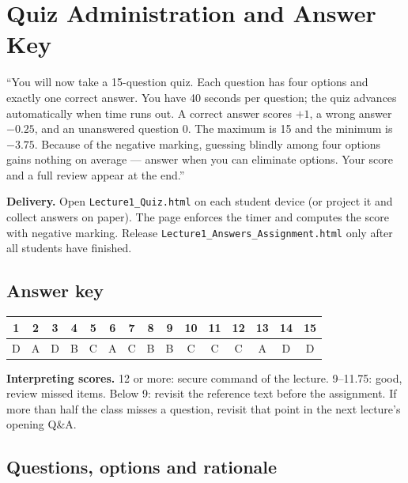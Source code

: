 \documentclass[11pt]{article}
\begin{document}
\section{Quiz Administration and Answer Key}

\begin{sayit}``You will now take a 15-question quiz. Each question has four options and exactly one correct answer. You have 40 seconds per question; the quiz advances automatically when time runs out. A correct answer scores $+1$, a wrong answer $-0.25$, and an unanswered question 0. The maximum is 15 and the minimum is $-3.75$. Because of the negative marking, guessing blindly among four options gains nothing on average --- answer when you can eliminate options. Your score and a full review appear at the end.''\end{sayit}

\textbf{Delivery.} Open \texttt{Lecture1\_Quiz.html} on each student device (or project it and collect answers on paper). The page enforces the timer and computes the score with negative marking. Release \texttt{Lecture1\_Answers\_Assignment.html} only after all students have finished.

\subsection*{Answer key}\begin{center}\small\renewcommand{\arraystretch}{1.3}\begin{tabular}{|c|c|c|c|c|c|c|c|c|c|c|c|c|c|c|}\hline \textbf{1} & \textbf{2} & \textbf{3} & \textbf{4} & \textbf{5} & \textbf{6} & \textbf{7} & \textbf{8} & \textbf{9} & \textbf{10} & \textbf{11} & \textbf{12} & \textbf{13} & \textbf{14} & \textbf{15}\\\hline D & A & D & B & C & A & C & B & B & C & C & C & A & D & D\\\hline\end{tabular}\end{center}

\textbf{Interpreting scores.} 12 or more: secure command of the lecture. 9--11.75: good, review missed items. Below 9: revisit the reference text before the assignment. If more than half the class misses a question, revisit that point in the next lecture's opening Q\&A.

\subsection*{Questions, options and rationale}
\end{document}
